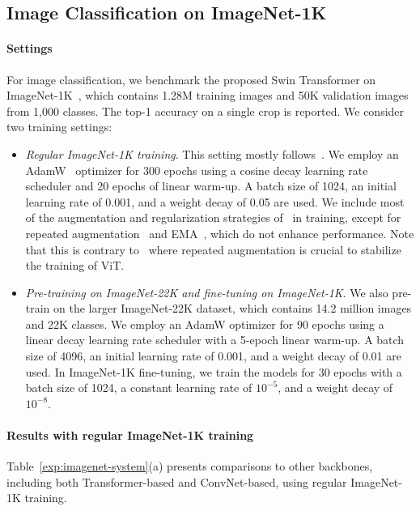 \documentclass[10pt,twocolumn,letterpaper]{article}
\begin{document}
\subsection{Image Classification on ImageNet-1K}

\paragraph{Settings} For image classification, we benchmark the proposed Swin Transformer on ImageNet-1K~\cite{deng2009imagenet}, which contains 1.28M training images and 50K validation images from 1,000 classes. The top-1 accuracy on a single crop is reported. We consider two training settings:
\begin{itemize}
    \item \emph{Regular ImageNet-1K training}. This setting mostly follows~\cite{touvron2020deit}. We employ an AdamW~\cite{kingma2014adam} optimizer for 300 epochs using a cosine decay learning rate scheduler and 20 epochs of linear warm-up. A batch size of 1024, an initial learning rate of 0.001, and a weight decay of 0.05 are used. We include most of the augmentation and regularization strategies of~\cite{touvron2020deit} in training, except for repeated augmentation~\cite{hoffer2020augment} and EMA~\cite{polyak1992acceleration}, which do not enhance performance. Note that this is contrary to~\cite{touvron2020deit} where repeated augmentation is crucial to stabilize the training of ViT. 
    \item \emph{Pre-training on ImageNet-22K and fine-tuning on ImageNet-1K}. We also pre-train on the larger ImageNet-22K dataset, which contains 14.2 million images and 22K classes. We employ an AdamW optimizer for 90 epochs using a linear decay learning rate scheduler with a 5-epoch linear warm-up. A batch size of 4096, an initial learning rate of 0.001, and a weight decay of 0.01 are used. In ImageNet-1K fine-tuning, we train the models for 30 epochs with a batch size of 1024, a constant learning rate of $10^{-5}$, and a weight decay of $10^{-8}$.
\end{itemize}

\paragraph{Results with regular ImageNet-1K training} Table~\ref{exp:imagenet-system}(a) presents comparisons to other backbones, including both Transformer-based and ConvNet-based, using regular ImageNet-1K training.
\end{document}
